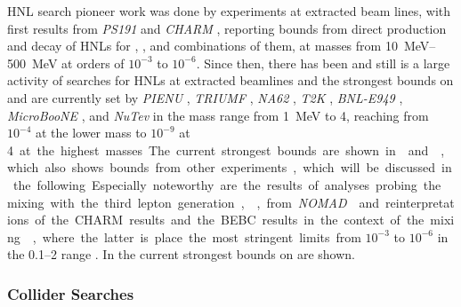 HNL search pioneer work was done by experiments at extracted beam lines, with first results from \textit{PS191}  and \textit{CHARM} , reporting bounds from direct production and decay of HNLs for , , and combinations of them, at masses from \SIrange{10}{500}{\mega\electronvolt} at orders of $10^{-3}$ to $10^{-6}$. Since then, there has been and still is a large activity of searches for HNLs at extracted beamlines and the strongest bounds on  and  are currently set by \textit{PIENU} , \textit{TRIUMF} , \textit{NA62} , \textit{T2K} , \textit{BNL-E949} , \textit{MicroBooNE} , and \textit{NuTev}  in the mass range from \SI{1}{\mega\electronvolt} to \SI{4}{\gev}, reaching from $10^{-4}$ at the lower mass to $10^{-9}$ at \SI{4} at the highest masses. The current strongest bounds are shown in  and , which also shows bounds from other experiments, which will be discussed in the following.

Especially noteworthy are the results of analyses probing the mixing with the third lepton generation, , from \textit{NOMAD}  and reinterpretations of the CHARM results and the BEBC results in the context of the mixing , where the latter is place the most stringent limits from $10^{-3}$ to $10^{-6}$ in the \SIrange{0.1}{2}{\gev} range . In  the current strongest bounds on  are shown.


\subsubsection{Collider Searches}

